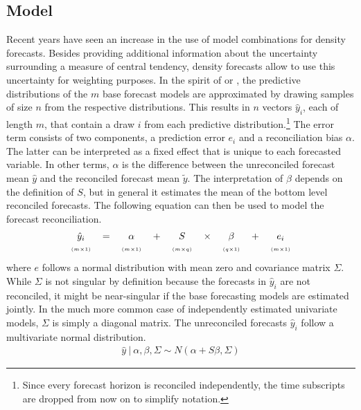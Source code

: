 \documentclass[a4paper,fleqn,11pt]{article}
\begin{document}
\subsection{Model}
Recent years have seen an increase in the use of model combinations for density forecasts. Besides providing additional information about the uncertainty surrounding a measure of central tendency, density forecasts allow to use this uncertainty for weighting purposes. In the spirit of \cite{Kapetanios2015} or \cite{Cesur2016}, the predictive distributions of the $m$ base forecast models are approximated by drawing samples of size $n$ from the respective distributions. This results in $n$ vectors $\hat{y}_{i}$, each of length $m$, that contain a draw $i$ from each predictive distribution.\footnote{Since every forecast horizon is reconciled independently, the time subscripts are dropped from now on to simplify notation.} The error term consists of two components, a prediction error $e_{i}$ and a reconciliation bias $\alpha$. The latter can be interpreted as a fixed effect that is unique to each forecasted variable. In other terms, $\alpha$ is the difference between the unreconciled forecast mean $\hat{y}$ and the reconciled forecast mean $\tilde{y}$. The interpretation of $\beta$ depends on the definition of $S$, but in general it estimates the mean of the bottom level reconciled forecasts. The following equation can then be used to model the forecast reconciliation.
\begin{align}
\label{eq:main}
\begin{tabular}{ccccccccc}
	$\hat{y}_i$ & $=$ & $\alpha$ & + &$S$ & $\times$ & $\beta$ & $+$ & $e_i$ \\
	$\scriptscriptstyle (m\times 1)$ & & $\scriptscriptstyle (m\times 1)$  & & $ \scriptscriptstyle (m\times q) $ & & $\scriptscriptstyle (q\times 1)$ & & $\scriptscriptstyle (m\times 1)$
\end{tabular}
\end{align}
where $e$ follows a normal distribution with mean zero and covariance matrix $\Sigma$. While $\Sigma$ is not singular by definition because the forecasts in $\hat{y}_{i}$ are not reconciled, it might be near-singular if the base forecasting models are estimated jointly. In the much more common case of independently estimated univariate models, $\Sigma$ is simply a diagonal matrix. The unreconciled forecasts $\hat{y}_{i}$ follow a multivariate normal distribution.
\begin{align}
\hat{y}\ |\ \alpha,\beta,\Sigma \sim N(\alpha + S\beta,\Sigma)
\end{align}
\end{document}
